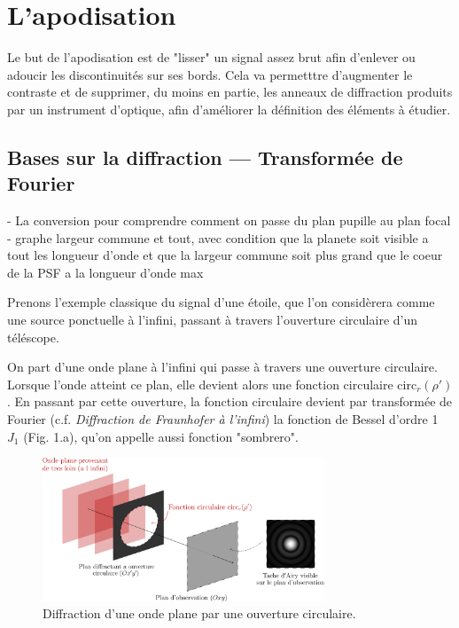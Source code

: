 \section{L'apodisation}

Le but de l'apodisation est de "lisser" un signal assez brut afin d'enlever ou adoucir les discontinuités sur ses bords. 
Cela va permetttre d'augmenter le contraste et de supprimer, du moins en partie, les anneaux de diffraction produits par un instrument d'optique, afin d'améliorer la définition des éléments à étudier.

\subsection{Bases sur la diffraction — Transformée de Fourier}

- La conversion pour comprendre comment on passe du plan pupille au plan focal
- graphe largeur commune et tout, avec condition que la planete soit visible a tout les longueur d’onde et que la largeur commune soit plus grand que le coeur de la PSF a la longueur d’onde max

Prenons l'exemple classique du signal d'une étoile, que l'on considèrera comme une source ponctuelle à l'infini, passant à travers l'ouverture circulaire d'un téléscope. 

On part d'une onde plane à l'infini qui passe à travers une ouverture circulaire. Lorsque l'onde atteint ce plan, elle devient alors une fonction circulaire $\text{circ}_r(\rho')$.
En passant par cette ouverture, la fonction circulaire devient par transformée de Fourier (c.f. \emph{Diffraction de Fraunhofer à l'infini}) la fonction de Bessel d'ordre 1 $J_1$ (Fig. 1.a), qu'on appelle aussi fonction "sombrero".

\begin{figure}[htbp]
    \centering
    \includegraphics[width=0.75\textwidth]{figures/diff.png}
    \caption{Diffraction d'une onde plane par une ouverture circulaire.}
\end{figure}

